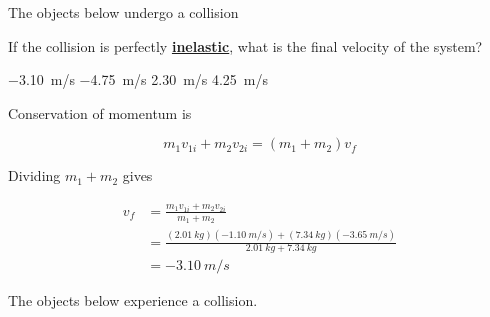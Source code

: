 \documentclass[]{exam}
\begin{document}
\begin{questions}
\begin{randomizechoices}[norandomize]
    \choice {}
    \correctchoice {}
    \choice {}
    \choice {}
\end{randomizechoices}


\question
The objects below undergo a collision

\begin{center}
\end{center}

If the collision is perfectly \textbf{\underline{inelastic}}, what is the final velocity of the system?

\begin{randomizechoices}
    \correctchoice \SI{-3.10}{m/s}
    \choice \SI{-4.75}{m/s}
    \choice \SI{2.30}{m/s}
    \choice \SI{4.25}{m/s}
\end{randomizechoices}

\begin{solution}
Conservation of momentum is

\begin{equation*}
    m_1 v_{1i} + m_2 v_{2i} = (m_1 + m_2) v_f
\end{equation*}

Dividing $m_1 + m_2$ gives

\begin{align*}
    v_f &= \frac{m_1 v_{1i} + m_2 v_{2i}}{m_1+m_2} \\[1ex]
    &= \frac{(\SI{2.01}{kg})(\SI{-1.10}{m/s}) + (\SI{7.34}{kg})(\SI{-3.65}{m/s})}{\SI{2.01}{kg} + \SI{7.34}{kg}} \\[1ex]
    & = \boxed{\SI{-3.10}{m/s}}
\end{align*}
\end{solution}

\question
The objects below experience a collision.


\end{questions}
\end{document}
